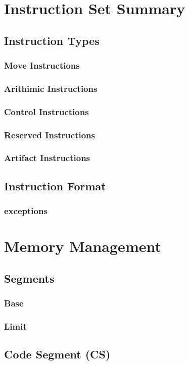 \documentclass[oneside, a4paper]{memoir}
\begin{document}
\chapter{Instruction Set Summary}
\section{Instruction Types}
\subsection{Move Instructions}
\subsection{Arithimic Instructions}
\subsection{Control Instructions}
\subsection{Reserved Instructions}
\subsection{Artifact Instructions}
\section{Instruction Format}
\subsection{exceptions}

\chapter{Memory Management}
\section{Segments}
\subsection{Base}
\subsection{Limit}
\section{Code Segment (CS)}
\end{document}
